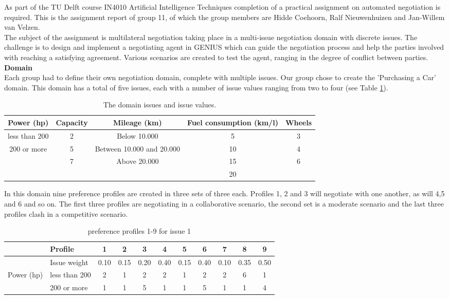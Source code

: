 \documentclass[11pt,a4paper]{report}
\begin{document}
As part of the TU Delft course IN4010 Artificial Intelligence Techniques completion of a practical assignment on automated negotiation is required. This is the assignment report of group 11, of which the group members are Hidde Coehoorn, Ralf Nieuwenhuizen and Jan-Willem van Velzen.\\

The subject of the assignment is multilateral negotiation taking place in a multi-issue negotiation domain with discrete issues. The challenge is to design and implement a negotiating agent in GENIUS which can guide the negotiation process and help the parties involved with reaching a satisfying agreement. Various scenarios are created to test the agent, ranging in the degree of conflict between parties.\\

\textbf{Domain}\\
Each group had to define their own negotiation domain, complete with multiple issues. Our group chose to create the 'Purchasing a Car' domain. This domain has a total of five issues, each with a number of issue values ranging from two to four (see Table \ref{tab:domainissues}).

\begin{table}[H]
\centering
\caption{The domain issues and issue values.}
\label{tab:domainissues}
\begin{tabular}{|c|c|c|c|c|}
\hline
Power (hp) & Capacity & Mileage (km) & Fuel consumption (km/l) & Wheels \\
\hline
less than 200 & 2 & Below 10.000 & 5 & 3 \\
200 or more & 5 & Between 10.000 and 20.000 & 10 & 4 \\
& 7 & Above 20.000 & 15 & 6 \\
& & & 20 & \\ 
\hline
\end{tabular}
\end{table}


In this domain nine preference profiles are created in three sets of three each. Profiles 1, 2 and 3 will negotiate with one another, as will 4,5 and 6 and so on. The first three profiles are negotiating in a collaborative scenario, the second set is a moderate scenario and the last three profiles clash in a competitive scenario. 

\newpage



\begin{table}[H]
\centering
\caption{preference profiles 1-9 for issue 1}
\label{tab:issue1}
\begin{tabular}{|p{3cm}|p{3cm}||c|c|c||c|c|c||c|c|c|}
\hline
&Profile & 1 & 2 & 3 & 4 & 5 & 6 & 7 & 8 & 9 \\
\hline
&Issue weight& 0.10 & 0.15 & 0.20 & 0.40 & 0.15 & 0.40 & 0.10 & 0.35 & 0.50 \\
\hline
\hline
Power (hp)&less than 200 & 2 & 1 &2 &2 &1 &2 &2 &6 &1 \\
&200 or more   & 1 & 1 &5 &1 &1 &5 &1 &1 &4 \\
\hline
\end{tabular}
\end{table}
\end{document}
